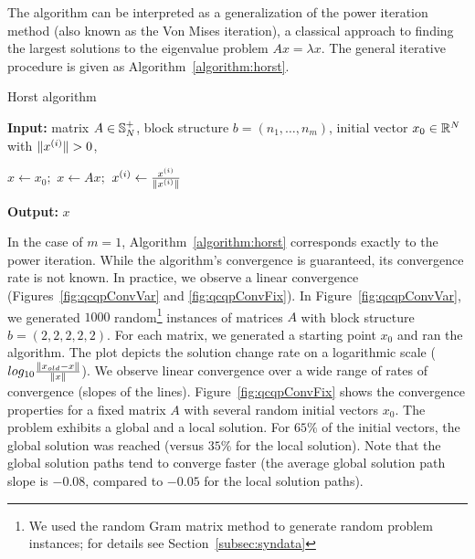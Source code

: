 The algorithm can be interpreted as a generalization of the power
iteration method (also known as the Von Mises iteration), a classical
approach to finding the largest solutions to the eigenvalue problem $A
x = \lambda x$.  The general iterative procedure is given as Algorithm~\ref{algorithm:horst}.
\begin{algorithm}
\caption{Horst algorithm}
\label{algorithm:horst}
{\bf Input:} matrix $A \in \mathbb{S}_N^+$, block structure $b = \left(n_1,\ldots,n_m\right)$, initial vector $x_0 \in \mathbb{R}^N$ with $\lVert x^{(i)}\rVert > 0$,  \par
\begin{algorithmic}
\STATE $x \leftarrow x_0;$
\STATE $x \leftarrow A x;$
\STATE $x^{(i)} \leftarrow \frac{x^{(i)}}{\lVert x^{(i)}\rVert}$
\ENDFOR
\ENDFOR
\end{algorithmic}
{\bf Output:} $x$
\end{algorithm}
In the case of $m=1$,  Algorithm~\ref{algorithm:horst}
corresponds exactly to the power iteration. While the algorithm's
convergence is guaranteed, its convergence rate is not known. In
practice, we observe a linear convergence (Figures~\ref{fig:qcqpConvVar}
and \ref{fig:qcqpConvFix}). In Figure~\ref{fig:qcqpConvVar}, we
generated $1000$ random\footnote{We used the random Gram matrix method
  to generate random problem instances; for details see
  Section~\ref{subsec:syndata}} instances of matrices $A$ with block
structure $b = \left(2,2,2,2,2\right)$. For each matrix, we generated
a starting point $x_0$ and ran the algorithm. The plot depicts the
solution change rate on a logarithmic scale ($log_{10}
\frac{\lVert x_{old} - x\rVert}{\lVert x\rVert}$). We observe linear convergence
over a wide range of rates of convergence (slopes of the
lines). Figure~\ref{fig:qcqpConvFix} shows the convergence properties
for a fixed matrix $A$ with several random initial vectors $x_0$. The
problem exhibits a global
and a local solution. For $65\%$ of the initial vectors, the global solution was reached (versus $35\%$ for the local solution). Note that the global
solution paths tend to converge faster (the average global solution path slope is  $-0.08$, compared  to $-0.05$ for the local solution paths).

